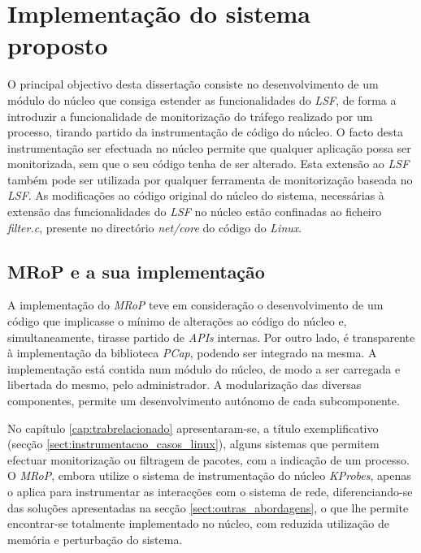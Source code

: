 \chapter{Implementação do sistema proposto}
\label{cap:Implementacao}

O principal objectivo desta dissertação consiste no desenvolvimento de um módulo do núcleo que consiga estender as funcionalidades do \textit{LSF}, de forma a introduzir a funcionalidade de monitorização do tráfego realizado por um processo, tirando partido da instrumentação de código do núcleo.
O facto desta instrumentação ser efectuada no núcleo permite que qualquer aplicação possa ser monitorizada, sem que o seu código tenha de ser alterado.
Esta extensão ao \textit{LSF} também pode ser utilizada por qualquer ferramenta de monitorização baseada no \textit{LSF}.
As modificações ao código original do núcleo do sistema, necessárias à extensão das funcionalidades do \textit{LSF} no núcleo estão confinadas ao ficheiro \textit{filter.c}, presente no directório \textit{net/core} do código do \textit{Linux}.

\section{MRoP e a sua implementação}
\label{sec:mrop_implementation}

A implementação do \textit{MRoP} teve em consideração o desenvolvimento de um código que implicasse o mínimo de alterações ao código do núcleo e, simultaneamente, tirasse partido de \textit{APIs} internas.
Por outro lado, é transparente à implementação da biblioteca \textit{PCap}, podendo ser integrado na mesma.
A implementação está contida num módulo do núcleo, de modo a ser carregada e libertada do mesmo, pelo administrador.
A modularização das diversas componentes, permite um desenvolvimento autónomo de cada subcomponente.

No capítulo \ref{cap:trabrelacionado} apresentaram-se, a título exemplificativo (secção \ref{sect:instrumentacao_casos_linux}), alguns sistemas que permitem efectuar monitorização ou filtragem de pacotes, com a indicação de um processo.
O \textit{MRoP}, embora utilize o sistema de instrumentação do núcleo \textit{KProbes}, apenas o aplica para instrumentar as interacções com o sistema de rede, diferenciando-se das soluções apresentadas na secção \ref{sect:outras_abordagens}, o que lhe permite encontrar-se totalmente implementado no núcleo, com reduzida utilização de memória e perturbação do sistema.

